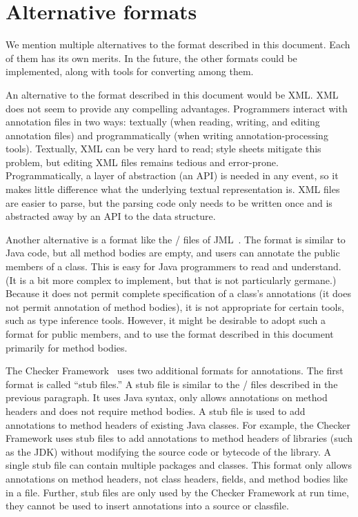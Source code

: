 \documentclass{article}
\newcommand{\code}[1]{\ifmmode{\mbox{\relax\ttfamily{#1}}}\else{\relax\ttfamily #1}\fi}
\begin{document}
\section{Alternative formats\label{alternative-formats}}

We mention multiple alternatives to the format described in this document.
Each of them has its own merits.
In the future, the other formats could be implemented, along with tools for
converting among them.



An alternative to the format described in this document would be XML\@.  
XML does not seem to provide any compelling advantages.  Programmers
interact with annotation files in two ways:  textually (when reading, writing,
and editing annotation files) and programmatically (when writing
annotation-processing tools).  Textually, XML can be
very hard to read; style sheets mitigate this
problem, but editing XML files remains tedious and error-prone.
Programmatically, a layer of abstraction (an API) is needed in any event, so it
makes little difference what the underlying textual representation is.
XML files are easier to parse, but the parsing code only needs to be
written once and is abstracted away by an API to the data structure.


Another alternative is a format like the \code{.spec}/\code{.jml} files
of JML~\cite{LeavensBR2006:JML}.  The format is similar to Java code, but
all method bodies are empty, and users can annotate the public members of a
class.  This is easy for Java programmers to read and understand.  (It is a
bit more complex to implement, but that is not particularly germane.)
Because it does not permit complete specification of a class's annotations
(it does not permit annotation of method bodies), it is not appropriate for
certain tools, such as type inference tools.  However, it might be desirable
to adopt such a format for public members, and to use the format
described in this document primarily for method bodies.


The Checker Framework~\cite{DietlDEMS2011,CF} uses two additional formats for
annotations. The first format is called ``stub files.'' A stub file is similar
to the \code{.spec}/\code{.jml} files described in the previous paragraph. It
uses Java syntax, only allows annotations on method headers and does not require
method bodies. A stub file is used to add annotations to method headers of
existing Java classes. For example, the Checker Framework uses stub files to add
annotations to method headers of libraries (such as the JDK) without modifying
the source code or bytecode of the library. A single stub file can contain
multiple packages and classes. This format only allows annotations on method
headers, not class headers, fields, and method bodies like in a \code{.jaif}
file. Further, stub files are only used by the Checker Framework at run time,
they cannot be used to insert annotations into a source or classfile.
\end{document}
